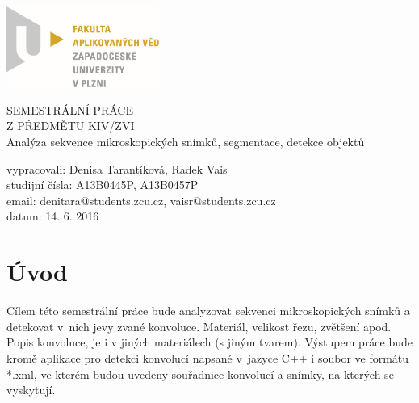 \documentclass[12pt, a4paper]{report}
\begin{document}
	\begin{titlepage}
	\includegraphics[width=5cm,natwidth=601,natheight=314]{obrazky/logo.png}
		
	\vspace{4cm}
		\begin {center}
		{\Huge SEMESTRÁLNÍ PRÁCE\\ Z PŘEDMĚTU KIV/ZVI\\}
		{\huge Analýza sekvence mikroskopických snímků, segmentace, detekce objektů\\}
		\end {center}
	\vspace{7cm}
			
	\noindent vypracovali: Denisa Tarantíková, Radek Vais \\
				studijní čísla: A13B0445P, A13B0457P\\
				email:	denitara@students.zcu.cz, vaisr@students.zcu.cz\\
				datum:	14. 6. 2016
	\end{titlepage}

\tableofcontents
\chapter{Úvod}
	Cílem této semestrální práce bude analyzovat sekvenci mikroskopických snímků a detekovat v~nich jevy zvané konvoluce. Materiál, velikost řezu, zvětšení apod. Popis konvoluce, je i v jiných materiálech (s jiným tvarem). Výstupem práce bude kromě aplikace pro detekci konvolucí napsané v~jazyce C++ i soubor ve formátu *.xml, ve kterém budou uvedeny souřadnice konvolucí a snímky, na kterých se vyskytují.
\end{document}
